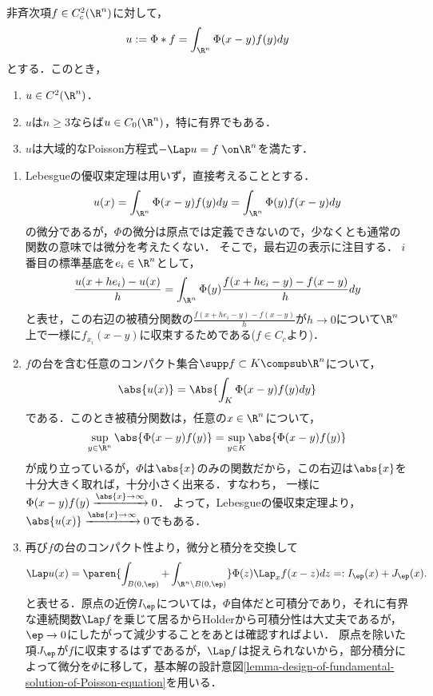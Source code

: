 \documentclass[uplatex,dvipdfmx]{jsreport}
\begin{document}
\begin{theorem}[基本解は畳み込みによって解を与える]\label{thm-solution-to-Poisson-equation}
    非斉次項$f\in C^2_c(\R^n)$に対して，
    \[u:=\Phi*f=\int_{\R^n}\Phi(x-y)f(y)dy\]
    とする．このとき，
    \begin{enumerate}
        \item $u\in C^2(\R^n)$．
        \item $u$は$n\ge3$ならば$u\in C_0(\R^n)$，特に有界でもある．
        \item $u$は大域的なPoisson方程式$-\Lap u=f\;\on\R^n$を満たす．
    \end{enumerate}
\end{theorem}
\begin{Proof}\mbox{}
    \begin{enumerate}
        \item Lebesgueの優収束定理は用いず，直接考えることとする．
        \[u(x)=\int_{\R^n}\Phi(x-y)f(y)dy=\int_{\R^n}\Phi(y)f(x-y)dy\]
        の微分であるが，$\Phi$の微分は原点では定義できないので，少なくとも通常の関数の意味では微分を考えたくない．
        そこで，最右辺の表示に注目する．
        $i$番目の標準基底を$e_i\in\R^n$として，
        \[\frac{u(x+he_i)-u(x)}{h}=\int_{\R^n}\Phi(y)\frac{f(x+he_i-y)-f(x-y)}{h}dy\]
        と表せ，この右辺の被積分関数の$\frac{f(x+he_i-y)-f(x-y)}{h}$が$h\to0$について$\R^n$上で一様に$f_{x_i}(x-y)$に収束するためである($f\in C_c$より)．
        \item $f$の台を含む任意のコンパクト集合$\supp f\subset K\compsub\R^n$について，
        \[\abs{u(x)}=\Abs{\int_K\Phi(x-y)f(y)dy}\]
        である．このとき被積分関数は，任意の$x\in\R^n$について，
        \[\sup_{y\in\R^n}\abs{\Phi(x-y)f(y)}=\sup_{y\in  K}\abs{\Phi(x-y)f(y)}\]
        が成り立っているが，$\Phi$は$\abs{x}$のみの関数だから，この右辺は$\abs{x}$を十分大きく取れば，十分小さく出来る．すなわち，
        一様に$\Phi(x-y)f(y)\xrightarrow{\abs{x}\to\infty}0$．
        よって，Lebesgueの優収束定理より，$\abs{u(x)}\xrightarrow{\abs{x}\to\infty}0$でもある．
        \item 再び$f$の台のコンパクト性より，微分と積分を交換して
        \[\Lap u(x)=\paren{\int_{B(0,\ep)}+\int_{\R^n\setminus B(0,\ep)}}\Phi(z)\Lap_x f(x-z)dz=:I_\ep(x)+J_\ep(x).\]
        と表せる．原点の近傍$I_\ep$については，$\Phi$自体だと可積分であり，それに有界な連続関数$\Lap f$を乗じて居るからHolderから可積分性は大丈夫であるが，$\ep\to0$にしたがって減少することをあとは確認すればよい．
        原点を除いた項$J_\ep$が$f$に収束するはずであるが，$\Lap f$は捉えられないから，部分積分によって微分を$\Phi$に移して，基本解の設計意図\ref{lemma-design-of-fundamental-solution-of-Poisson-equation}を用いる．
        

\end{enumerate}
\end{Proof}
\end{document}
